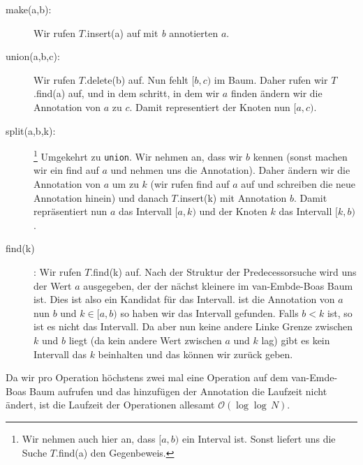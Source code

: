 \documentclass[11pt,a4paper,ngerman]{article}
\begin{document}
\begin{description}
	\item[make(a,b):]  Wir rufen $T$.insert(a) auf mit \emph{b} annotierten $a$.
	\item[union(a,b,c):] Wir rufen $T$.delete(b) auf. Nun fehlt $[b,c)$ im Baum. Daher rufen wir $T$.find(a) auf, und
		in dem schritt, in dem wir $a$ finden ändern wir die Annotation von $a$ zu $c$. Damit representiert der Knoten nun $[a,c)$.
	\item[split(a,b,k):]\footnote{Wir nehmen auch hier an, dass $[a,b)$ ein Interval ist. Sonst liefert uns die Suche $T$.find(a) den Gegenbeweis.}
		 Umgekehrt zu \lstinline|union|. Wir nehmen an, dass wir $b$ kennen (sonst machen wir ein find auf $a$ und nehmen
		uns die Annotation). Daher ändern wir die Annotation von $a$ um zu $k$ (wir rufen find auf $a$ auf und schreiben die neue Annotation 	
		hinein) und danach $T$.insert(k) mit Annotation $b$. Damit repräsentiert nun $a$ das Intervall $[a,k)$ und der Knoten $k$ das Intervall
		$[k,b)$. 
	\item[find(k)] : Wir rufen $T$.find(k) auf. Nach der Struktur der Predecessorsuche wird uns der Wert $a$ ausgegeben, der der nächst kleinere
		im van-Embde-Boas Baum ist. Dies ist also ein Kandidat für das Intervall. ist die Annotation von $a$ nun $b$ und $k \in [a,b)$ so
		haben wir das Intervall gefunden. Falls $b < k$ ist, so ist es nicht das Intervall. Da aber nun keine andere Linke Grenze zwischen $k$ und 		
		$b$ liegt (da kein andere Wert zwischen $a$ und $k$ lag) gibt es kein Intervall das $k$ beinhalten und das können wir zurück geben.
\end{description}

Da wir pro Operation höchstens zwei mal eine Operation auf dem van-Emde-Boas Baum aufrufen und das hinzufügen der Annotation die Laufzeit nicht ändert, ist die Laufzeit der Operationen allesamt $\mathcal{O}(\log \log \, N)$.

\label{LastPage}
\end{document}
